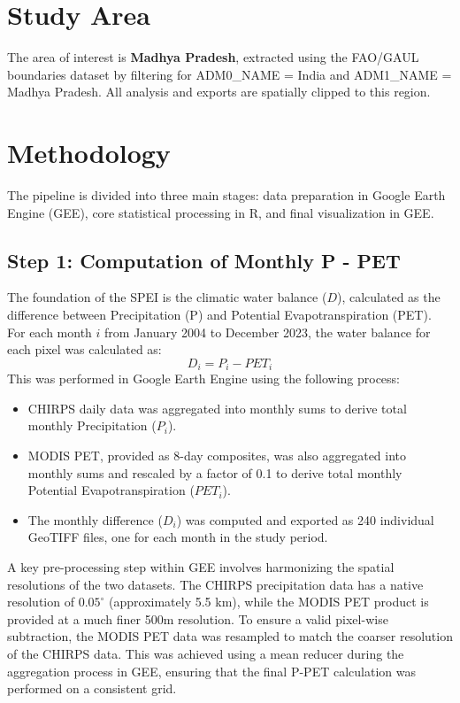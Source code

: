 \documentclass[12pt, a4paper]{article}
\begin{document}
\section{Study Area}
The area of interest is \textbf{Madhya Pradesh}, extracted using the FAO/GAUL boundaries dataset \cite{fao2015gaul} by filtering for ADM0\_NAME = India and ADM1\_NAME = Madhya Pradesh. All analysis and exports are spatially clipped to this region.

\section{Methodology}
The pipeline is divided into three main stages: data preparation in Google Earth Engine (GEE), core statistical processing in R, and final visualization in GEE.

\subsection{Step 1: Computation of Monthly P - PET}
The foundation of the SPEI is the climatic water balance ($D$), calculated as the difference between Precipitation (P) and Potential Evapotranspiration (PET). For each month $i$ from January 2004 to December 2023, the water balance for each pixel was calculated as:
\[ D_i = P_i - PET_i \]
This was performed in Google Earth Engine using the following process:
\begin{itemize}
    \item CHIRPS daily data was aggregated into monthly sums to derive total monthly Precipitation ($P_i$).
    \item MODIS PET, provided as 8-day composites, was also aggregated into monthly sums and rescaled by a factor of 0.1 to derive total monthly Potential Evapotranspiration ($PET_i$).
    \item The monthly difference ($D_i$) was computed and exported as 240 individual GeoTIFF files, one for each month in the study period.
\end{itemize}
A key pre-processing step within GEE involves harmonizing the spatial resolutions of the two datasets. The CHIRPS precipitation data has a native resolution of $0.05^{\circ}$ (approximately 5.5 km), while the MODIS PET product is provided at a much finer 500m resolution. To ensure a valid pixel-wise subtraction, the MODIS PET data was resampled to match the coarser resolution of the CHIRPS data. This was achieved using a mean reducer during the aggregation process in GEE, ensuring that the final P-PET calculation was performed on a consistent grid.
\end{document}
